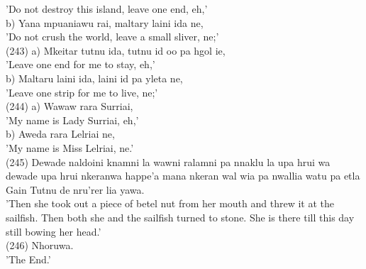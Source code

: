 \documentclass[10pt]{article}
\begin{document}
'Do not destroy this island, leave one end, eh,'\\
b) Yana mpuaniawu rai, maltary laini ida ne,\\
'Do not crush the world, leave a small sliver, ne;'\\
(243) a) Mkeitar tutnu ida, tutnu id oo pa hgol ie,\\
'Leave one end for me to stay, eh,'\\
b) Maltaru laini ida, laini id pa yleta ne,\\
'Leave one strip for me to live, ne;'\\
(244) a) Wawaw rara Surriai,\\
'My name is Lady Surriai, eh,'\\
b) Aweda rara Lelriai ne,\\
'My name is Miss Lelriai, ne.'\\
(245) Dewade naldoini knamni la wawni ralamni pa nnaklu la upa hrui wa dewade upa hrui nkeranwa happe'a mana nkeran wal wia pa nwallia watu pa etla Gain Tutnu de nru'rer lia yawa.\\
'Then she took out a piece of betel nut from her mouth and threw it at the sailfish. Then both she and the sailfish turned to stone. She is there till this day still bowing her head.'\\
(246) Nhoruwa.\\
'The End.'
\end{document}
